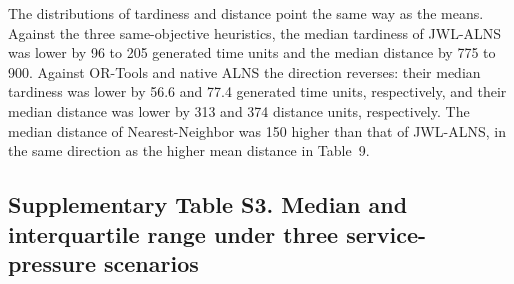 \documentclass[11pt,a4paper]{article}
\begin{document}
The distributions of tardiness and distance point the same way as the means. Against the three same-objective heuristics, the median tardiness of JWL-ALNS was lower by 96 to 205 generated time units and the median distance by 775 to 900. Against OR-Tools and native ALNS the direction reverses: their median tardiness was lower by 56.6 and 77.4 generated time units, respectively, and their median distance was lower by 313 and 374 distance units, respectively. The median distance of Nearest-Neighbor was 150 higher than that of JWL-ALNS, in the same direction as the higher mean distance in Table~9.

\subsection*{Supplementary Table S3. Median and interquartile range under three service-pressure scenarios}
\end{document}
